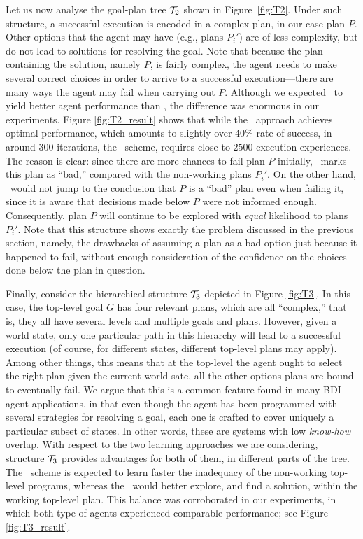 Let us now analyse the goal-plan tree ${\mathcal{T}}_2$ shown in Figure~\ref{fig:T2}.
Under such structure, a successful execution is encoded in a complex plan, in our
case plan $P$. Other options that the agent may have (e.g., plans $P_i'$) are of
less complexity, but do not lead to solutions for resolving the goal.
Note that because the plan containing the solution, namely $P$, is fairly
complex, the agent needs to make several correct choices in order to arrive to a
successful execution---there are many ways the agent may fail when carrying out
$P$.
Although we expected \BUL\ to yield better agent performance than \CL, the
difference was enormous in our experiments. Figure \ref{fig:T2_result} shows that
while the \BUL\ approach achieves optimal performance, which amounts to slightly
over $40\%$ rate of success, in around $300$ iterations, the \CL\ scheme,
requires close to $2500$ execution experiences. The reason is clear: since there
are more chances to fail plan $P$ initially, \CL\ marks this plan as ``bad,''
compared with the non-working plans $P_i'$. On the other hand, \BUL\ would not
jump to the conclusion that $P$ is a ``bad'' plan even when failing it, since it
is aware that decisions made below $P$ were not informed enough. Consequently,
plan $P$ will continue to be explored with \emph{equal} likelihood to plans
$P_i'$.
Note that this structure shows exactly the problem discussed in the previous
section, namely, the drawbacks of assuming a plan as a bad option just because it
happened to fail, without enough consideration of the confidence on the choices
done below the plan in question.


Finally, consider the hierarchical structure ${\mathcal{T}}_3$ depicted in Figure
\ref{fig:T3}.
In this case, the top-level goal $G$ has four relevant plans, which are all
``complex,'' that is, they all have several levels and multiple goals and plans.
However, given a world state, only one particular path in this hierarchy will
lead to a successful execution (of course, for different states, different
top-level plans may apply). Among other things, this means that at the top-level
the agent ought to select the right plan given the current world sate, all the
other options plans are bound to eventually fail.
We argue that this is a common feature found in many BDI agent applications, in
that even though the agent has been programmed with several strategies for
resolving a goal, each one is crafted to cover uniquely a particular subset of
states. In other words, these are systems with low \emph{know-how} overlap.
With respect to the two learning approaches we are considering, structure ${\mathcal{T}}_3$
provides advantages for both of them, in different parts of the tree. The \CL\
scheme is expected to learn faster the inadequacy of the non-working top-level
programs, whereas the \BUL\ would better explore, and find a solution, within the
working top-level plan. This balance was corroborated in our experiments, in
which both type of agents experienced comparable performance; see Figure
\ref{fig:T3_result}.




